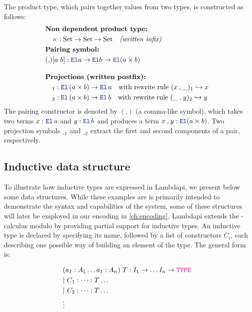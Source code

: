 \begin{example}\label{def-product}
The product type, which pairs together values from two types, is constructed as follows:
\begin{align*}
&\textbf{Non dependent product type:} \\
&\quad \times \index{$\times$} : \text{Set} \to \text{Set} \to \text{Set} \quad \textit{(written infix)} \\
&\textbf{Pairing symbol:} \\
&(\mathbin{,}) \index{$(\_ \mathbin{,} \_)$} [a~b] : \el a \ra \el b \ra \el (a \times b)\\[1em]
&\textbf{Projections (written postfix):}  \\
&\quad {}_1 \index{${}_1$}: \el\, (a \times b) \ra \el\, a \quad \text{with rewrite rule } (x \mathbin{,} \_)_1 \re x \\
&\quad {}_2 \index{${}_2$}: \el\, (a \times b) \ra \el\, b \quad \text{with rewrite rule } (\_ \mathbin{,} y)_2 \re y
\end{align*}
The pairing constructor is denoted by $(\mathbin{,})$ (a comma-like symbol), which takes two terms $x : \el\, a$ and $y : \el\, b$ and produces a term $x \mathbin{,} y : \el (a \times b)$.
Two projection symbols ${\_}_1$ and ${\_}_2$ extract the first and second components of a pair, respectively.
\end{example}

\subsection{Inductive data structure}

To illustrate how inductive types are expressed in Lambdapi, we present below some data structures.
While these examples are is primarily intended to demonstrate the syntax and capabilities of the system, some of these structures will later be employed in our encoding in \cref{ch:encoding}.
Lambdapi extends the \lpm-calculus modulo by providing partial support for inductive types.
An inductive type is declared by specifying its name, followed by a list of constructors $C_i$, each describing one possible way of building an element of the type.
The general form is:

\begin{align*}
&(a_1 : A_1 \dots a_1 : A_n)~T : I_1 \ra \dots I_n \ra \type\\
&|~C_1 : \dots : T \dots\\
&|~C_2 : \dots : T \dots\\
&\vdots
\end{align*}

